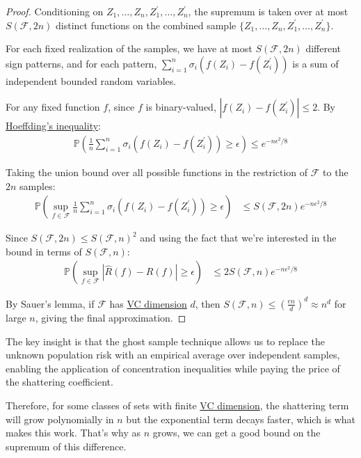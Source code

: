\begin{proof}
    Conditioning on $Z_1, \ldots, Z_n, Z_1^{\prime}, \ldots, Z_n^{\prime}$, the supremum is taken over at most $S(\mathcal{F}, 2n)$ distinct functions on the combined sample $\{Z_1, \ldots, Z_n, Z_1^{\prime}, \ldots, Z_n^{\prime}\}$.
   
    For each fixed realization of the samples, we have at most $S(\mathcal{F}, 2n)$ different sign patterns, and for each pattern, $\sum_{i=1}^n \sigma_i (f(Z_i) - f(Z_i^{\prime}))$ is a sum of independent bounded random variables.
   
    For any fixed function $f$, since $f$ is binary-valued, $|f(Z_i) - f(Z_i^{\prime})| \leq 2$. By \hyperref[thm:hoeffdings-inequality]{Hoeffding's inequality}:
    \begin{align}
      \mathbb{P} \left( \frac{1}{n} \sum_{i=1}^n \sigma_i (f(Z_i) - f(Z_i^{\prime})) \geq \epsilon \right) \leq e^{-n\epsilon^2/8}
    \end{align}
   
    Taking the union bound over all possible functions in the restriction of $\mathcal{F}$ to the $2n$ samples:
    \begin{align}
      \mathbb{P} \left( \sup_{f \in \mathcal{F}} \frac{1}{n} \sum_{i=1}^n \sigma_i (f(Z_i) - f(Z_i^{\prime})) \geq \epsilon \right) &\leq S(\mathcal{F}, 2n) e^{-n\epsilon^2/8}
    \end{align}
   
    Since $S(\mathcal{F}, 2n) \leq S(\mathcal{F}, n)^2$ and using the fact that we're interested in the bound in terms of $S(\mathcal{F}, n)$:
    \begin{align}
      \mathbb{P} \left( \sup_{f \in \mathcal{F}} | \hat{R}(f) - R(f) | \geq \epsilon \right) &\leq 2 S(\mathcal{F}, n) e^{-n\epsilon^2/8}
    \end{align}
   
    By Sauer's lemma, if $\mathcal{F}$ has \hyperref[def:vc-dimension]{VC dimension} $d$, then $S(\mathcal{F}, n) \leq \left(\frac{en}{d}\right)^d \approx n^d$ for large $n$, giving the final approximation.
  \end{proof}

  The key insight is that the ghost sample technique allows us to replace the unknown population risk with an empirical average over independent samples, enabling the application of concentration inequalities while paying the price of the shattering coefficient.

  Therefore, for some classes of sets with finite \hyperref[def:vc-dimension]{VC dimension}, the shattering term will grow polynomially in $n$ but the exponential term decays faster, which is what makes this work. That's why as $n$ grows, we can get a good bound on the supremum of this difference. 

